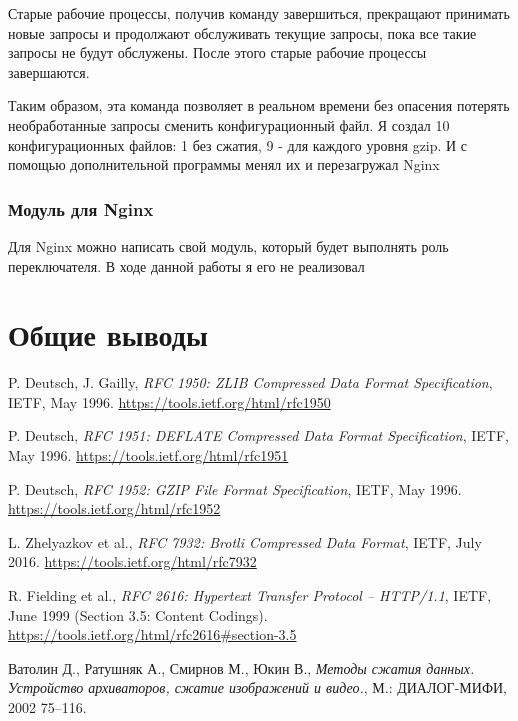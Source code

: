\documentclass[12pt]{article}
\begin{document}
Старые рабочие процессы, получив команду завершиться, прекращают принимать новые запросы и продолжают обслуживать текущие запросы, пока все такие запросы не будут обслужены. После этого старые рабочие процессы завершаются.

Таким образом, эта команда позволяет в реальном времени без опасения потерять необработанные запросы сменить конфигурационный файл. Я создал 10 конфигурационных файлов: 1 без сжатия, 9 - для каждого уровня gzip. И с помощью дополнительной
программы менял их и перезагружал Nginx

\subsubsection{Модуль для Nginx}

Для Nginx можно написать свой модуль, который будет выполнять роль переключателя. В ходе данной работы я его не реализовал

\section{Общие выводы}


\begin{thebibliography}{9}
    P. Deutsch, J. Gailly,
    \textit{RFC 1950: ZLIB Compressed Data Format Specification},
    IETF, May 1996.
    \url{https://tools.ietf.org/html/rfc1950}

    P. Deutsch,
    \textit{RFC 1951: DEFLATE Compressed Data Format Specification},
    IETF, May 1996.
    \url{https://tools.ietf.org/html/rfc1951}

    P. Deutsch,
    \textit{RFC 1952: GZIP File Format Specification},
    IETF, May 1996.
    \url{https://tools.ietf.org/html/rfc1952}

    L. Zhelyazkov et al.,
    \textit{RFC 7932: Brotli Compressed Data Format},
    IETF, July 2016.
    \url{https://tools.ietf.org/html/rfc7932}

    R. Fielding et al.,
    \textit{RFC 2616: Hypertext Transfer Protocol -- HTTP/1.1},
    IETF, June 1999 (Section 3.5: Content Codings).
    \url{https://tools.ietf.org/html/rfc2616#section-3.5}

    Ватолин Д., Ратушняк А., Смирнов М., Юкин В.,
    \textit{Методы сжатия данных. Устройство архиваторов, сжатие изображений и видео.},
    М.: ДИАЛОГ-МИФИ, 2002 75--116.

\end{thebibliography}
\end{document}
